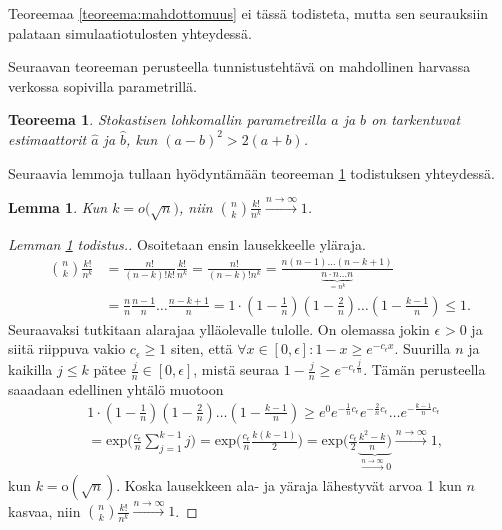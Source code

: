 \documentclass[finnish,12pt,a4paper,pdftex,sci,utf8]{aaltothesis}
\newtheorem{lemma}{Lemma}
\newtheorem{teoreema}{Teoreema}
\begin{document}
Teoreemaa \ref{teoreema:mahdottomuus} ei tässä todisteta, mutta sen seurauksiin palataan simulaatiotulosten yhteydessä.

Seuraavan teoreeman perusteella tunnistustehtävä on mahdollinen harvassa verkossa sopivilla parametrillä.
\begin{teoreema}
	\label{teoreema:tarkentuvatest}
	Stokastisen lohkomallin parametreilla $a$ ja $b$ on tarkentuvat estimaattorit $\hat{a}$ ja $\hat{b}$, kun $(a-b)^{2} > 2(a+b)$.
\end{teoreema}

Seuraavia lemmoja tullaan hyödyntämään teoreeman \ref{teoreema:tarkentuvatest} todistuksen yhteydessä.
\begin{lemma}
	\label{lemma:kombinaatiokertoma_nk}
	Kun $k = o\big(\sqrt{n}\big)$, niin $\binom{n}{k}\frac{k!}{n^{k}} \xrightarrow{n \to \infty} 1$.
\end{lemma}
\begin{proof}[Lemman \ref{lemma:kombinaatiokertoma_nk} todistus.]
	Osoitetaan ensin lausekkeelle yläraja.
	\begin{align*}
		\binom{n}{k}\frac{k!}{n^{k}} &= \frac{n!}{(n-k)!k!} \frac{k!}{n^k} = \frac{n!}{(n-k)!n^k} = \frac{n (n-1) \ldots (n-k+1)}{\underbrace{n \cdot n \ldots n}_{=n^k}}  \\ &= \frac{n}{n} \frac{n-1}{n} \ldots \frac{n-k+1}{n} = 1 \cdot (1 -\frac{1}{n}) (1-\frac{2}{n}) \ldots (1 - \frac{k-1}{n}) \leq 1.
	\end{align*}
	Seuraavaksi tutkitaan alarajaa ylläolevalle tulolle. On olemassa jokin $\epsilon_{}^{} > 0$ ja siitä riippuva vakio $c_{\epsilon} \geq 1$ siten, että $\forall x \in [0, \epsilon] : 1-x \geq e^{-c_{\epsilon}x}$. Suurilla $n$ ja kaikilla $j \leq k$ pätee $\frac{j}{n} \in [0, \epsilon]$, mistä seuraa $1 - \frac{j}{n} \geq e^{-c_{\epsilon} \frac{j}{n}}$. Tämän perusteella saaadaan edellinen yhtälö muotoon
	\begin{align*}
		&1 \cdot (1 -\frac{1}{n}) (1-\frac{2}{n}) \ldots (1 - \frac{k-1}{n}) \geq e^0 e^{-\frac{1}{n}c{_\epsilon}} e^{-\frac{2}{n}c{_\epsilon}} \ldots e^{-\frac{k-1}{n}c{_\epsilon}} \\
		&= \text{exp}\big(\frac{c{_\epsilon}}{n} \sum_{j=1}^{k-1} j \big) = \text{exp}\big(\frac{c{_\epsilon}}{n} \frac{k(k-1)}{2} \big) = \text{exp}\big(\frac{c{_\epsilon}}{2} \underbrace{\frac{k^2 - k}{n} \big)}_{\xrightarrow{n \rightarrow \infty}0}  \xrightarrow{n \rightarrow \infty} 1,
	\end{align*}
	kun $k = \text{o}(\sqrt{n})$. Koska lausekkeen ala- ja yäraja lähestyvät arvoa 1 kun $n$ kasvaa, niin $\binom{n}{k}\frac{k!}{n^{k}} \xrightarrow{n \to \infty} 1$.
\end{proof}
\end{document}
